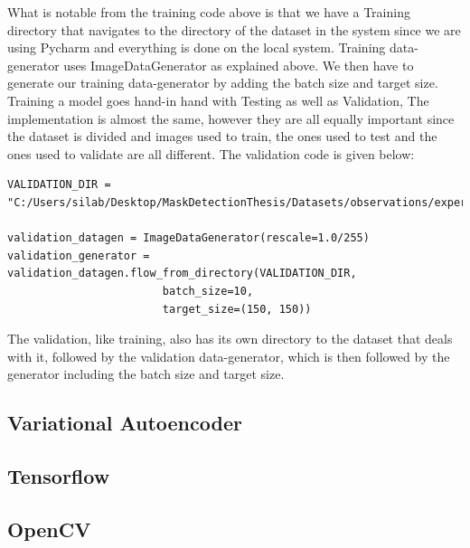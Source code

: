 What is notable from the training code above is that we have a Training directory that navigates to the directory of the dataset in the system since we are using Pycharm and everything is done on the local system. Training data-generator uses ImageDataGenerator as explained above. We then have to generate our training data-generator by adding the batch size and target size.
\vspace{5mm}
Training a model goes hand-in hand with Testing as well as Validation, The implementation is almost the same, however they are all equally important since the dataset is divided and images used to train, the ones used to test and the ones used to validate are all different. The validation code is given below:
\vspace{5mm}
\begin{lstlisting}
VALIDATION_DIR = "C:/Users/silab/Desktop/MaskDetectionThesis/Datasets/observations/experiements/dest_folder/val"

validation_datagen = ImageDataGenerator(rescale=1.0/255)
validation_generator = validation_datagen.flow_from_directory(VALIDATION_DIR,
                        batch_size=10,
                        target_size=(150, 150))
\end{lstlisting}
\vspace{4mm}
The validation, like training, also has its own directory to the dataset that deals with it, followed by the validation data-generator, which is then followed by the generator including the batch size and target size.
\subsection{Variational Autoencoder}
\subsection{Tensorflow}
\subsection{OpenCV}